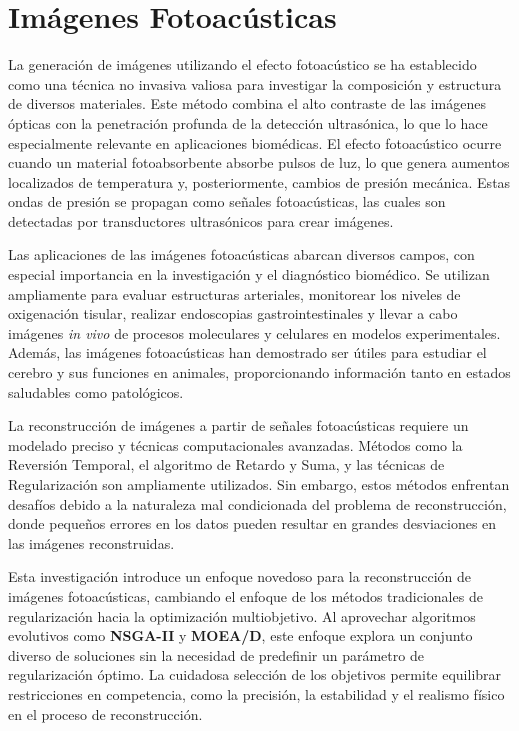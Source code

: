 \section{Imágenes Fotoacústicas} \label{sec:intro}

La generación de imágenes utilizando el efecto fotoacústico se ha establecido como una técnica no invasiva valiosa para investigar la composición y estructura de diversos materiales. Este método combina el alto contraste de las imágenes ópticas con la penetración profunda de la detección ultrasónica, lo que lo hace especialmente relevante en aplicaciones biomédicas. El efecto fotoacústico ocurre cuando un material fotoabsorbente absorbe pulsos de luz, lo que genera aumentos localizados de temperatura y, posteriormente, cambios de presión mecánica. Estas ondas de presión se propagan como señales fotoacústicas, las cuales son detectadas por transductores ultrasónicos para crear imágenes.

Las aplicaciones de las imágenes fotoacústicas abarcan diversos campos, con especial importancia en la investigación y el diagnóstico biomédico. Se utilizan ampliamente para evaluar estructuras arteriales, monitorear los niveles de oxigenación tisular, realizar endoscopias gastrointestinales y llevar a cabo imágenes \textit{in vivo} de procesos moleculares y celulares en modelos experimentales. Además, las imágenes fotoacústicas han demostrado ser útiles para estudiar el cerebro y sus funciones en animales, proporcionando información tanto en estados saludables como patológicos.

La reconstrucción de imágenes a partir de señales fotoacústicas requiere un modelado preciso y técnicas computacionales avanzadas. Métodos como la Reversión Temporal, el algoritmo de Retardo y Suma, y las técnicas de Regularización son ampliamente utilizados. Sin embargo, estos métodos enfrentan desafíos debido a la naturaleza mal condicionada del problema de reconstrucción, donde pequeños errores en los datos pueden resultar en grandes desviaciones en las imágenes reconstruidas.

Esta investigación introduce un enfoque novedoso para la reconstrucción de imágenes fotoacústicas, cambiando el enfoque de los métodos tradicionales de regularización hacia la optimización multiobjetivo. Al aprovechar algoritmos evolutivos como \textbf{NSGA-II} y \textbf{MOEA/D}, este enfoque explora un conjunto diverso de soluciones sin la necesidad de predefinir un parámetro de regularización óptimo. La cuidadosa selección de los objetivos permite equilibrar restricciones en competencia, como la precisión, la estabilidad y el realismo físico en el proceso de reconstrucción.


